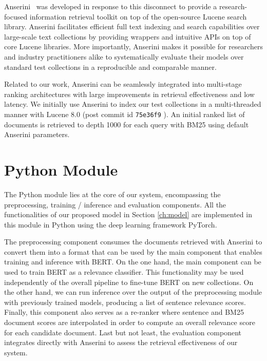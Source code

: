Anserini~\cite{Yang_etal_SIGIR2017, Yang_etal_JDIQ2018} was developed in response to this disconnect to provide a research-focused information retrieval toolkit on top of the open-source Lucene search library.
Anserini facilitates efficient full text indexing and search capabilities over large-scale text collections by providing wrappers and intuitive APIs on top of core Lucene libraries.
More importantly, Anserini makes it possible for researchers and industry practitioners alike to systematically evaluate their models over standard test collections in a reproducible and comparable manner.

Related to our work, Anserini can be seamlessly integrated into multi-stage ranking architectures with large improvements in retrieval effectiveness and low latency.
We initially use Anserini to index our test collections in a multi-threaded manner with Lucene 8.0 (post commit id \texttt{75e36f9} ).
An initial ranked list of documents is retrieved to depth 1000 for each query with BM25 using default Anserini parameters.


\section{Python Module}

The Python module lies at the core of our system, encompassing the preprocessing, training / inference and evaluation components.
All the functionalities of our proposed model in Section \ref{ch:model} are implemented in this module in Python using the deep learning framework PyTorch.

The preprocessing component consumes the documents retrieved with Anserini to convert them into a format that can be used by the main component that enables training and inference with BERT.
On the one hand, the main component can be used to train BERT as a relevance classifier.
This functionality may be used independently of the overall pipeline to fine-tune BERT on new collections.
On the other hand, we can run inference over the output of the preprocessing module with previously trained models, producing a list of sentence relevance scores.
Finally, this component also serves as a re-ranker where sentence and BM25 document scores are interpolated in order to compute an overall relevance score for each candidate document.
Last but not least, the evaluation component integrates directly with Anserini to assess the retrieval effectiveness of our system.


